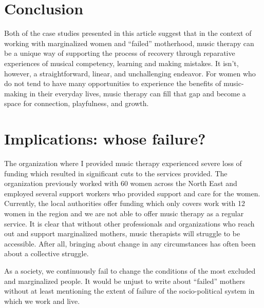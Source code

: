 \documentclass[authordate, empirical]{jote-new-article}
\begin{document}
\section{Conclusion}







Both of the case studies presented in this article suggest that in the context of working with marginalized women and “failed” motherhood, music therapy can be a unique way of supporting the process of recovery through reparative experiences of musical competency, learning and making mistakes. It isn't, however, a straightforward, linear, and unchallenging endeavor. For women who do not tend to have many opportunities to experience the benefits of music-making in their everyday lives, music therapy can fill that gap and become a space for connection, playfulness, and growth.







\section{Implications: whose failure?}







The organization where I provided music therapy experienced severe loss of funding which resulted in significant cuts to the services provided. The organization previously worked with 60 women across the North East and employed several support workers who provided support and care for the women. Currently, the local authorities offer funding which only covers work with 12 women in the region and we are not able to offer music therapy as a regular service. It is clear that without other professionals and organizations who reach out and support marginalized mothers, music therapists will struggle to be accessible. After all, bringing about change in any circumstances has often been about a collective struggle.







As a society, we continuously fail to change the conditions of the most excluded and marginalized people. It would be unjust to write about “failed” mothers without at least mentioning the extent of failure of the socio-political system in which we work and live.
\end{document}
